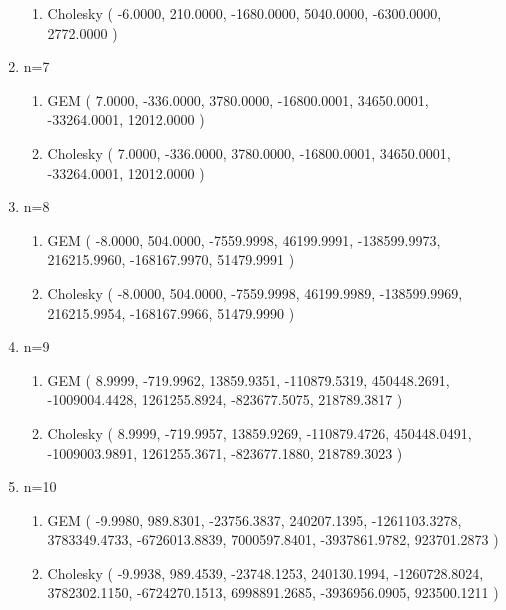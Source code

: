 \begin{enumerate}
\begin{enumerate}
				\item Cholesky\newline
				( -6.0000, 210.0000, -1680.0000, 5040.0000, -6300.0000, 2772.0000 )
			\end{enumerate}
			\item n=7
			\begin{enumerate}
				\item GEM\newline
				( 7.0000, -336.0000, 3780.0000, -16800.0001, 34650.0001, -33264.0001, 12012.0000 )
				\item Cholesky\newline
				( 7.0000, -336.0000, 3780.0000, -16800.0001, 34650.0001, -33264.0001, 12012.0000 )
			\end{enumerate}
			\item n=8
			\begin{enumerate}
				\item GEM\newline
				( -8.0000, 504.0000, -7559.9998, 46199.9991, -138599.9973, 216215.9960, -168167.9970, 51479.9991 )
				\item Cholesky\newline
				( -8.0000, 504.0000, -7559.9998, 46199.9989, -138599.9969, 216215.9954, -168167.9966, 51479.9990 )
			\end{enumerate}
			\item n=9
			\begin{enumerate}
				\item GEM\newline
				( 8.9999, -719.9962, 13859.9351, -110879.5319, 450448.2691, -1009004.4428, 1261255.8924, -823677.5075, 218789.3817 )
				\item Cholesky\newline
				( 8.9999, -719.9957, 13859.9269, -110879.4726, 450448.0491, -1009003.9891, 1261255.3671, -823677.1880, 218789.3023 )
			\end{enumerate}
			\item n=10
			\begin{enumerate}
				\item GEM\newline
				( -9.9980, 989.8301, -23756.3837, 240207.1395, -1261103.3278, 3783349.4733, -6726013.8839, 7000597.8401, -3937861.9782, 923701.2873 )
				\item Cholesky\newline
				( -9.9938, 989.4539, -23748.1253, 240130.1994, -1260728.8024, 3782302.1150, -6724270.1513, 6998891.2685, -3936956.0905, 923500.1211 )
			\end{enumerate}
		\end{enumerate}
